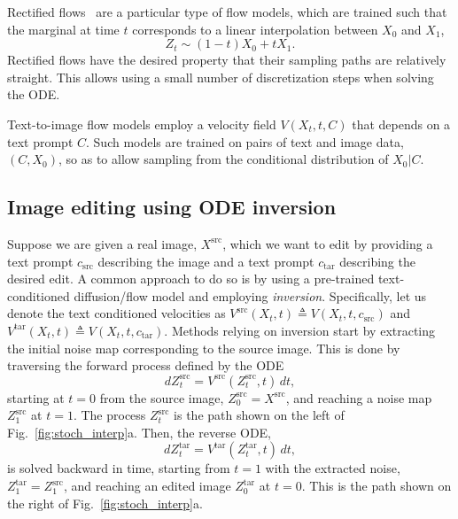 Rectified flows~\citep{albergo2023building, lipman2023flow, liu2023flow} are a particular type of flow models, which are trained such that the marginal at time $t$ corresponds to a linear interpolation between $X_0$ and $X_1$, 
\begin{equation}
\label{eq:linear_interpolant}
    Z_t \sim (1-t) X_0 + t X_1. 
\end{equation} 
Rectified flows have the desired property that their sampling paths are relatively straight. This allows using a small number of discretization steps when solving the ODE.

Text-to-image flow models employ a velocity field $V(X_t, t, C)$ that depends on a text prompt $C$. Such models are trained on pairs of text and image data, $(C,X_0)$, so as to allow sampling from the conditional distribution of $X_0|C$.

\subsection{Image editing using ODE inversion}
\label{sec:ode_inversion}
Suppose we are given a real image, $X^{\text{src}}$, which we want to edit by providing a text prompt $c_{\text{src}}$ describing the image and a text prompt $c_{\text{tar}}$ describing the desired edit. A common approach to do so is by using a pre-trained text-conditioned diffusion/flow model and employing \emph{inversion}. Specifically, let us denote the text conditioned velocities as $V^{\text{src}}(X_t, t)\triangleq V(X_t, t, c_{\text{src}})$ and $V^{\text{tar}}(X_t, t)\triangleq V(X_t, t, c_{\text{tar}})$. 
Methods relying on inversion start by extracting the initial noise map corresponding to the source image. This is done by traversing the forward process defined by the ODE
\begin{equation}
\label{eq:inv_edit_fwd}
    dZ^{\text{src}}_t= V^{\text{src}}(Z^{\text{src}}_t,t)\,dt,
\end{equation}
starting at $t=0$ from the source image, $Z^{\text{src}}_0=X^{\text{src}}$, and reaching a noise map $Z^{\text{src}}_1$ at $t=1$. 
The process $Z^{\text{src}}_t$ is the path shown on the left of Fig.~\ref{fig:stoch_interp}a. Then, the reverse ODE,
\begin{equation}
\label{eq:inv_edit_rev}
    dZ^{\text{tar}}_t = V^{\text{tar}}(Z^{\text{tar}}_t,t)\,dt,
\end{equation}
is solved backward in time, starting from $t=1$ with the extracted noise, $Z^{\text{tar}}_1=Z_1^{\text{src}}$, and reaching an edited image $Z^{\text{tar}}_0$ at $t=0$. This is the path shown on the right of Fig.~\ref{fig:stoch_interp}a.

